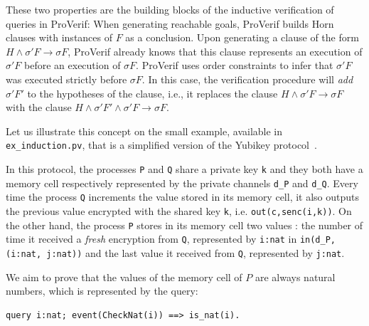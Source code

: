 \documentclass{book}
\begin{document}
These two properties are the building blocks of the inductive verification of queries in ProVerif: When generating reachable goals, ProVerif builds Horn clauses with instances of $F$ as a conclusion. Upon generating a clause of the form $H \wedge \sigma' F \rightarrow \sigma F$, ProVerif already knows that this clause represents an execution of $\sigma' F$ before an execution of $\sigma F$.
ProVerif uses order constraints to infer that $\sigma' F$ was executed strictly before $\sigma F$. In this case, the verification procedure will \emph{add} $\sigma' F'$ to the hypotheses of the clause, i.e., it replaces the clause $H \wedge \sigma' F \rightarrow \sigma F$ with the clause $H \wedge \sigma' F' \wedge \sigma' F \rightarrow \sigma F$.

Let us illustrate this concept on the small example, available in \texttt{{\docexdir}ex\_induction.pv}, that is a simplified version of the Yubikey protocol~\cite{yubikey}.



In this protocol, the processes \lstinline!P! and \lstinline!Q! share a private key \lstinline!k! and they both have a memory cell respectively represented by the private channels \lstinline!d_P! and \lstinline!d_Q!. Every time the process \lstinline!Q! increments the value stored in its memory cell, it also outputs the previous value encrypted with the shared key \lstinline!k!, i.e. \lstinline!out(c,senc(i,k))!. On the other hand, the process \lstinline!P! stores in its memory cell two values : the number of time it received a \emph{fresh} encryption from \lstinline!Q!, represented by \lstinline!i:nat! in \lstinline!in(d_P,(i:nat, j:nat))! and the last value it received from \lstinline!Q!, represented by \lstinline!j:nat!.

We aim to prove that the values of the memory cell of $P$ are always natural numbers, which is represented by the query:
\begin{lstlisting}[numbers=none]
	query i:nat; event(CheckNat(i)) ==> is_nat(i).
\end{lstlisting}
\end{document}
